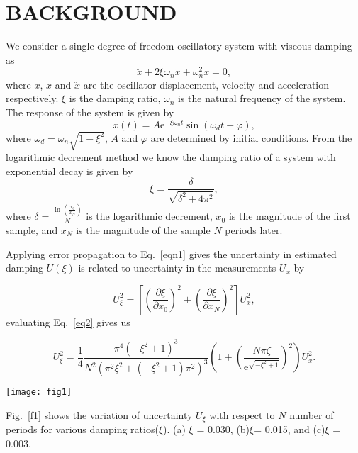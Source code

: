 \section{BACKGROUND}
\label{sec:background}
We consider a single degree of freedom oscillatory system with viscous damping as
\begin{equation}
\ddot{x}+2 \xi \omega_{n} \dot{x}+\omega_{n}^{2} x=0,
\end{equation}
where $x$, $\dot{x}$ and $\ddot{x}$ are the oscillator displacement, velocity and acceleration respectively. $\xi$ is the damping ratio, $\omega_{n}$ is the natural frequency of the system.
The response of the system is given by
\begin{equation}
x(t)=A \mathrm{e}^{-\xi \omega_{n} t} \sin \left(\omega_{d} t+\varphi\right),
\end{equation}
where $\omega_{d}=\omega_{n} \sqrt{1-\xi^{2}}$, $A$ and $\varphi$ are determined by initial conditions.
From the logarithmic decrement method we know the damping ratio of a system with exponential decay is given by
\begin{equation}
\label{eqn1}
\xi=\frac{\delta}{\sqrt{\delta^{2}+4 \pi^{2}}},
\end{equation}
where $\delta=\frac{\ln \left(\frac{x_{0}}{x_{N}}\right)}{N}$ is the logarithmic decrement, $x_{0}$ is the magnitude of the first sample, and $x_{N}$ is the magnitude of the sample $N$ periods later.

Applying error propagation to Eq.~\ref{eqn1} gives the uncertainty in estimated damping $U(\xi)$ is related to uncertainty in the measurements $U_{x}$ by

\begin{equation}
\label{eq2}
U^{2}_{\xi}=\left[\left(\frac{\partial \xi}{\partial x_{0}}\right)^{2}+\left(\frac{\partial \xi}{\partial x_{N}}\right)^{2}\right] U_{x}^{2},
\end{equation}
evaluating Eq.~\ref{eq2} gives us

\begin{equation}
U^{2}_{\xi}=\frac{1}{4} \frac{\pi^{4}\left(-\xi^{2}+1\right)^{3}}{N^{2}\left(\pi^{2} \xi^{2}+\left(-\xi^{2}+1\right) \pi^{2}\right)^{3}}
\left( 1+\left(\frac{N \pi \zeta}{\mathrm{e}^{\sqrt{-\zeta^{2}+1}}}\right)^{2} \right) U_{x}^2.
\end{equation}
\begin{figure*}[h]



\texttt{[image: fig1]}
\centering
\caption{The variation of uncertainty $U_\xi$ with respect to  number of periods $N$ for various damping ratios($\xi$). (a) $\xi$ = 0.030, (b)$\xi$= 0.015, and (c)$\xi$ = 0.003.}
\label{f1}


\end{figure*}
Fig.~\ref{f1} shows the variation of uncertainty $U_\xi$ with respect to $N$ number of periods for various damping ratios($\xi$). (a) $\xi$ = 0.030, (b)$\xi$= 0.015, and (c)$\xi$ = 0.003.

